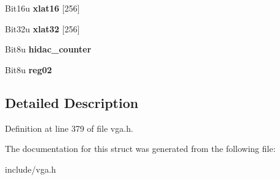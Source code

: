 \begin{DoxyCompactItemize}
\item 
\hypertarget{structVGA__Dac_a0ecbd2205771f2bd6eeda1e799f17597}{Bit16u {\bfseries xlat16} \mbox{[}256\mbox{]}}\label{structVGA__Dac_a0ecbd2205771f2bd6eeda1e799f17597}

\item 
\hypertarget{structVGA__Dac_a9bd0942c9ea49acc3d4055ffd6115901}{Bit32u {\bfseries xlat32} \mbox{[}256\mbox{]}}\label{structVGA__Dac_a9bd0942c9ea49acc3d4055ffd6115901}

\item 
\hypertarget{structVGA__Dac_acb8aaed4d1da7f09f5875bc6d4907721}{Bit8u {\bfseries hidac\-\_\-counter}}\label{structVGA__Dac_acb8aaed4d1da7f09f5875bc6d4907721}

\item 
\hypertarget{structVGA__Dac_a5d62487fbce7e19eaeb97eb8685dd301}{Bit8u {\bfseries reg02}}\label{structVGA__Dac_a5d62487fbce7e19eaeb97eb8685dd301}

\end{DoxyCompactItemize}


\subsection{Detailed Description}


Definition at line 379 of file vga.\-h.



The documentation for this struct was generated from the following file\-:\begin{DoxyCompactItemize}
\item 
include/vga.\-h\end{DoxyCompactItemize}
